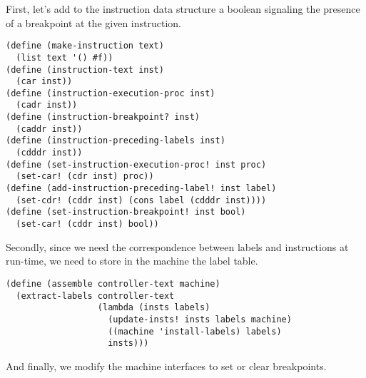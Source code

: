 \documentclass[a4paper,12pt]{article}
\begin{document}
First, let's add to the instruction data structure a boolean signaling
the presence of a breakpoint at the given instruction.

\begin{lstlisting}
(define (make-instruction text)
  (list text '() #f))
(define (instruction-text inst)
  (car inst))
(define (instruction-execution-proc inst)
  (cadr inst))
(define (instruction-breakpoint? inst)
  (caddr inst))
(define (instruction-preceding-labels inst)
  (cdddr inst))
(define (set-instruction-execution-proc! inst proc)
  (set-car! (cdr inst) proc))
(define (add-instruction-preceding-label! inst label)
  (set-cdr! (cddr inst) (cons label (cdddr inst))))
(define (set-instruction-breakpoint! inst bool)
  (set-car! (cddr inst) bool))
\end{lstlisting}

Secondly, since we need the correspondence between labels and
instructions at run-time, we need to store in the machine the label
table.

\begin{lstlisting}
(define (assemble controller-text machine)
  (extract-labels controller-text
                  (lambda (insts labels)
                    (update-insts! insts labels machine)
                    ((machine 'install-labels) labels)
                    insts)))
\end{lstlisting}

And finally, we modify the machine interfaces to set or clear
breakpoints.
\end{document}
